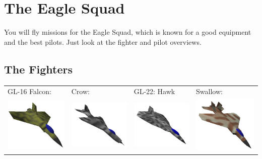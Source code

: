 \chapter{The Eagle Squad}
\label{chap:squad}

You will fly missions for the Eagle Squad, which
is known for a good equipment and the best pilots.
Just look at the fighter and pilot overviews.


\section{The Fighters}
\label{sec:fighters}

\begin{center}
\begin{tabular}{p{3cm}p{3cm}p{3cm}p{3cm}}
GL-16 Falcon: &
Crow: &
GL-22: Hawk &
Swallow:\\
\includegraphics[width=4cm]{falcon.jpg} &
\includegraphics[width=4cm]{crow.jpg} &
\includegraphics[width=4cm]{hawk.jpg} &
\includegraphics[width=4cm]{swallow.jpg}\\
\end{tabular}
\end{center}

